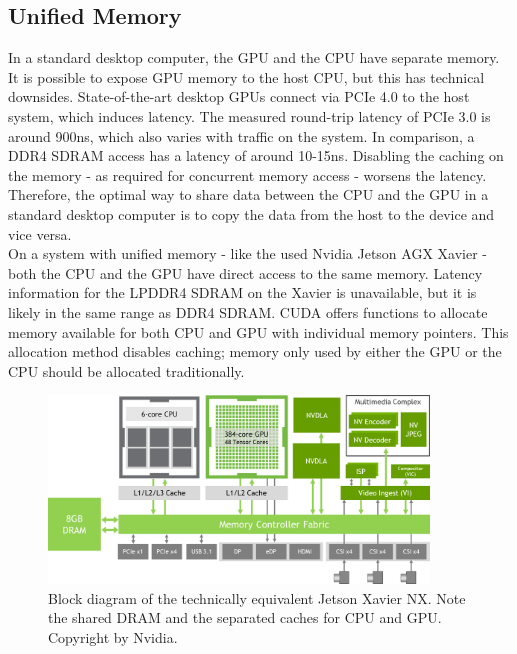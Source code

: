 \subsection{Unified Memory}
\label{sec:unifiedMemory}
In a standard desktop computer, the GPU and the CPU have separate memory. It is possible to expose GPU memory to the host CPU, but this has technical downsides. State-of-the-art desktop GPUs connect via PCIe 4.0 to the host system, which induces latency.
The measured round-trip latency of PCIe 3.0 is around 900ns\cite{PCIe_performance}, which also varies with traffic on the system. In comparison, a DDR4 SDRAM access has a latency of around 10-15ns\cite{Wiki_CAS}. Disabling the caching on the memory - as required for concurrent memory access - worsens the latency. Therefore, the optimal way to share data between the CPU and the GPU in a standard desktop computer is to copy the data from the host to the device and vice versa.\\
On a system with unified memory - like the used Nvidia Jetson AGX Xavier - both the CPU and the GPU have direct access to the same memory. Latency information for the LPDDR4 SDRAM on the Xavier is unavailable, but it is likely in the same range as DDR4 SDRAM. CUDA offers functions to allocate memory available for both CPU and GPU with individual memory pointers. This allocation method disables caching; memory only used by either the GPU or the CPU should be allocated traditionally.\\
\begin{figure}[H]
    \centering
    \includegraphics[width=0.90\textwidth]{images/Jetson_Xavier_NX_Block_Diagram.png}
    \caption{Block diagram of the technically equivalent Jetson Xavier NX. Note the shared DRAM and the separated caches for CPU and GPU. Copyright by Nvidia.}
    \label{im:XavierNX}
\end{figure}
